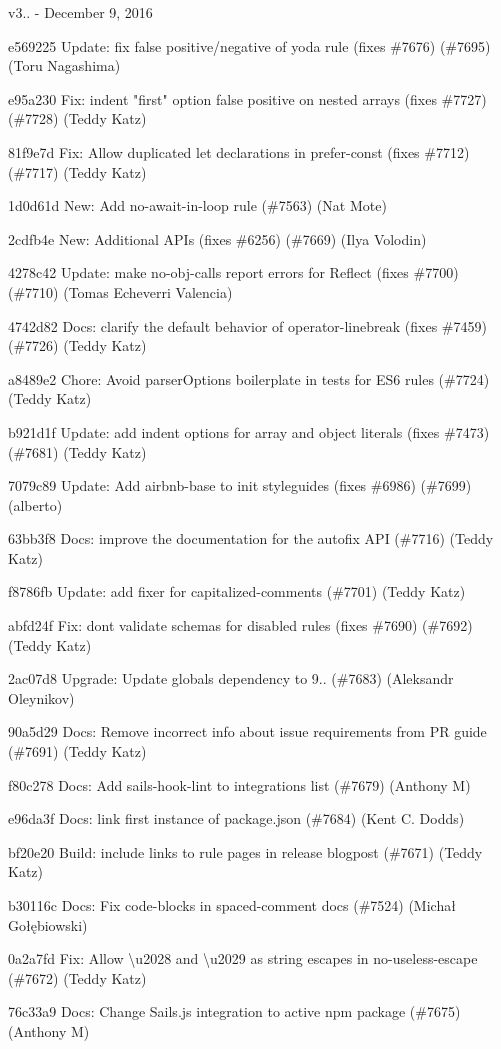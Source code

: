 v3.. -\/ December 9, 2016


\begin{DoxyItemize}
\item e569225 Update\+: fix false positive/negative of yoda rule (fixes \#7676) (\#7695) (Toru Nagashima)
\item e95a230 Fix\+: indent "{}first"{} option false positive on nested arrays (fixes \#7727) (\#7728) (Teddy Katz)
\item 81f9e7d Fix\+: Allow duplicated let declarations in {\ttfamily prefer-\/const} (fixes \#7712) (\#7717) (Teddy Katz)
\item 1d0d61d New\+: Add no-\/await-\/in-\/loop rule (\#7563) (Nat Mote)
\item 2cdfb4e New\+: Additional APIs (fixes \#6256) (\#7669) (Ilya Volodin)
\item 4278c42 Update\+: make no-\/obj-\/calls report errors for Reflect (fixes \#7700) (\#7710) (Tomas Echeverri Valencia)
\item 4742d82 Docs\+: clarify the default behavior of {\ttfamily operator-\/linebreak} (fixes \#7459) (\#7726) (Teddy Katz)
\item a8489e2 Chore\+: Avoid parser\+Options boilerplate in tests for ES6 rules (\#7724) (Teddy Katz)
\item b921d1f Update\+: add {\ttfamily indent} options for array and object literals (fixes \#7473) (\#7681) (Teddy Katz)
\item 7079c89 Update\+: Add airbnb-\/base to init styleguides (fixes \#6986) (\#7699) (alberto)
\item 63bb3f8 Docs\+: improve the documentation for the autofix API (\#7716) (Teddy Katz)
\item f8786fb Update\+: add fixer for {\ttfamily capitalized-\/comments} (\#7701) (Teddy Katz)
\item abfd24f Fix\+: don\textquotesingle{}t validate schemas for disabled rules (fixes \#7690) (\#7692) (Teddy Katz)
\item 2ac07d8 Upgrade\+: Update globals dependency to 9.. (\#7683) (Aleksandr Oleynikov)
\item 90a5d29 Docs\+: Remove incorrect info about issue requirements from PR guide (\#7691) (Teddy Katz)
\item f80c278 Docs\+: Add sails-\/hook-\/lint to integrations list (\#7679) (Anthony M)
\item e96da3f Docs\+: link first instance of {\ttfamily package.\+json} (\#7684) (Kent C. Dodds)
\item bf20e20 Build\+: include links to rule pages in release blogpost (\#7671) (Teddy Katz)
\item b30116c Docs\+: Fix code-\/blocks in spaced-\/comment docs (\#7524) (Michał Gołębiowski)
\item 0a2a7fd Fix\+: Allow \textbackslash{}u2028 and \textbackslash{}u2029 as string escapes in no-\/useless-\/escape (\#7672) (Teddy Katz)
\item 76c33a9 Docs\+: Change Sails.\+js integration to active npm package (\#7675) (Anthony M)
\end{DoxyItemize}

